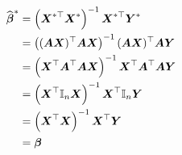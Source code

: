 \begin{questions}
\begin{solution}
\begin{parts}
\begin{subparts}
            \subpart
            \begin{align*}
                \widehat{\boldsymbol{\beta}}^* 
                &= \left(\boldsymbol{X}^{*\top}\boldsymbol{X}^*\right)^{-1} \boldsymbol{X}^{*\top} \boldsymbol{Y}^* \cr
                &= \left((\boldsymbol{A} \boldsymbol{X})^\top\boldsymbol{A} \boldsymbol{X}\right)^{-1} (\boldsymbol{A} \boldsymbol{X})^{\top} \boldsymbol{A} \boldsymbol{Y} \cr
                &= \left(\boldsymbol{X}^{\top}\boldsymbol{A} ^\top \boldsymbol{A} \boldsymbol{X}\right)^{-1}  \boldsymbol{X}^{\top}\boldsymbol{A}^\top \boldsymbol{A} \boldsymbol{Y} \cr
                &= \left(\boldsymbol{X}^{\top}\mathbb{I}_n \boldsymbol{X}\right)^{-1}  \boldsymbol{X}^{\top}\mathbb{I}_n \boldsymbol{Y} \cr
                 &= \left(\boldsymbol{X}^{\top} \boldsymbol{X}\right)^{-1}  \boldsymbol{X}^{\top} \boldsymbol{Y}  \cr
                 &= \boldsymbol{\beta}
            \end{align*}
            
        \end{subparts}

\end{parts}
\end{solution}
\end{questions}
